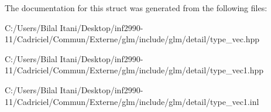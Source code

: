 The documentation for this struct was generated from the following files\+:\begin{DoxyCompactItemize}
\item 
C\+:/\+Users/\+Bilal Itani/\+Desktop/inf2990-\/11/\+Cadriciel/\+Commun/\+Externe/glm/include/glm/detail/type\+\_\+vec.\+hpp\item 
C\+:/\+Users/\+Bilal Itani/\+Desktop/inf2990-\/11/\+Cadriciel/\+Commun/\+Externe/glm/include/glm/detail/type\+\_\+vec1.\+hpp\item 
C\+:/\+Users/\+Bilal Itani/\+Desktop/inf2990-\/11/\+Cadriciel/\+Commun/\+Externe/glm/include/glm/detail/type\+\_\+vec1.\+inl\end{DoxyCompactItemize}
